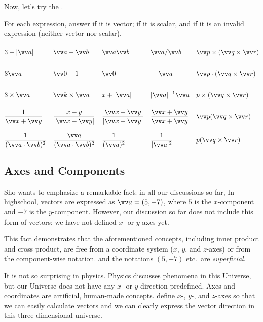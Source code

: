 \documentclass[11pt,pdfa,lastpage]{MishoNote}
\begin{document}
Now, let's try the .
\begin{problems}
\Problem[S] For each expression, answer  if it is vector;  if it is scalar, and  if it is an invalid expression (neither vector nor scalar).
\begin{align*}\def\baselinestretch{2}
  & 3+|\vc a|
  && \vc a-\vc b
  && \vc a\vc b
  && \vc a/\vc b
  && \vc p\times(\vc q\times\vc r)
\\[.5em]& 3\vc a
  && \vc 0+1
  && \vc 0
  && -\vc a
  && \vc p\cdot(\vc q\times\vc r)
\\[.5em]& 3\times\vc a
  && \vc k\times\vc a
  && x+|\vc a|
  && |\vc a|^{-1}\vc a
  && p\times(\vc q\times\vc r)
\\[.5em]& \frac{1}{\vc x+\vc y}
  && \frac{x+y}{|\vc x+\vc y|}
  && \frac{\vc x+\vc y}{|\vc x+\vc y|}
  && \frac{\vc x+\vc y}{\vc x+\vc y}
  && \vc p(\vc q\times\vc r)
\\[.5em]& \frac{1}{(\vc a\cdot\vc b)^2}
  && \frac{\vc a}{(\vc a\cdot\vc b)^2}
  && \frac{1}{(\vc a)^2}
  && \frac{1}{|\vc a|^2}
  && p(\vc q\times\vc r)
\end{align*}
\end{problems}

\newpage
\subsection{Axes and Components}\label{sec:component}
Sho wants to emphasize a remarkable fact: in all our discussions so far,  In highschool, vectors are expressed as $\vc a=(5,-7)$, where $5$ is the $x$-component and $-7$ is the $y$-component. However, our discussion so far does not include this form of vectors; we have not defined $x$- or $y$-axes yet.

This fact demonstrates that the aforementioned concepts, including inner product and cross product, are free from a coordinate system ($x$, $y$, and $z$-axes) or from the component-wise notation.  and the notations $(5,-7)$ etc.\ are \emph{superficial}.

It is not so surprising in physics. Physics discusses phenomena in this Universe, but our Universe does not have any $x$- or $y$-direction predefined. Axes and coordinates are artificial, human-made concepts.  define $x$-, $y$-, and $z$-axes so that we can easily calculate vectors and we can clearly express the vector direction in this three-dimensional universe.
\end{document}
